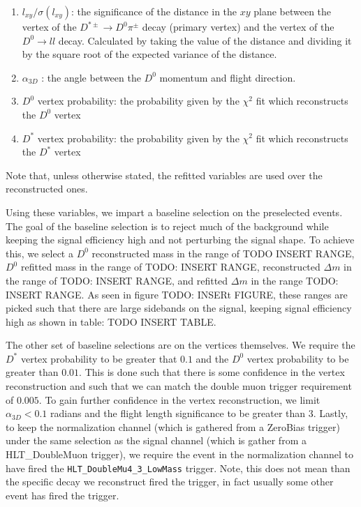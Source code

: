 \begin{enumerate}
    \item $l_{xy}/\sigma\left(l_{xy}\right)$: the significance of the distance in the $xy$ plane between the vertex of the $D^{*\pm} \to D^0 \pi^\pm$ decay (primary vertex) and the vertex of the $D^0 \to l l$ decay. Calculated by taking the value of the distance and dividing it by the square root of the expected variance of the distance. 
    \item $\alpha_{3D}$ : the angle between the $D^0$ momentum and flight direction. 
    \item $D^0$ vertex probability: the probability given by the $\chi^2$ fit which reconstructs the $D^0$ vertex 
    \item $D^*$ vertex probability: the probability given by the $\chi^2$ fit which reconstructs the $D^*$ vertex
\end{enumerate}
Note that, unless otherwise stated, the refitted variables are used over the reconstructed ones. 

Using these variables, we impart a baseline selection on the preselected events. The goal of the baseline selection is to reject much of the background while keeping the signal efficiency high and not perturbing the signal shape. To achieve this, we select a $D^0$ reconstructed mass in the range of TODO INSERT RANGE, $D^0$ refitted mass in the range of TODO: INSERT RANGE, reconstructed $\Delta m$ in the range of TODO: INSERT RANGE, and refitted $\Delta m$ in the range TODO: INSERT RANGE. As seen in figure TODO: INSERt FIGURE, these ranges are picked such that there are large sidebands on the signal, keeping signal efficiency high as shown in table: TODO INSERT TABLE.

The other set of baseline selections are on the vertices themselves. We require the $D^*$ vertex probability to be greater that $0.1$ and the $D^0$ vertex probability to be greater than $0.01$. This is done such that there is some confidence in the vertex reconstruction and such that we can match the double muon trigger requirement of $0.005$. To gain further confidence in the vertex reconstruction, we limit $\alpha_{3D} < 0.1$ radians and the flight length significance to be greater than 3. Lastly, to keep the normalization channel (which is gathered from a ZeroBias trigger) under the same selection as the signal channel (which is gather from a HLT\_DoubleMuon trigger), we require the event in the normalization channel to have fired the \texttt{HLT\_DoubleMu4\_3\_LowMass} trigger. Note, this does not mean than the specific decay we reconstruct fired the trigger, in fact usually some other event has fired the trigger. 

